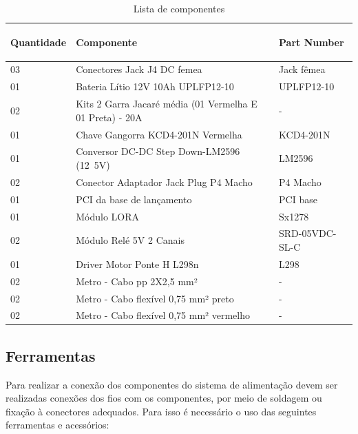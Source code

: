 \begin{table}[H]
\centering
\begin{tabular}{|m{1.8cm} |m{9.2cm}|m{4cm}|}
\hline
\begin{center}Quantidade\end{center} & \begin{center}Componente\end{center} &\begin{center} Part Number\end{center} \\\hline
 03&Conectores Jack J4 DC femea& Jack fêmea \\\hline
 01 & Bateria Lítio 12V 10Ah UPLFP12-10 & UPLFP12-10 \\\hline
 02 & Kits 2 Garra Jacaré média (01 Vermelha E 01 Preta) - 20A & - \\\hline
 01 & Chave Gangorra KCD4-201N Vermelha & KCD4-201N \\\hline
 01 &  Conversor DC-DC Step Down-LM2596 (12~5V)
& LM2596 \\\hline
 02 & Conector Adaptador Jack Plug P4 Macho &  P4 Macho \\\hline
01& PCI da base de lançamento & PCI base \\\hline
01 & Módulo LORA  & Sx1278\\\hline
02 &Módulo Relé 5V 2 Canais   & SRD-05VDC-SL-C  \\\hline
01&Driver Motor Ponte H L298n& L298\\\hline
02 & Metro - Cabo pp 2X2,5 mm² & - \\\hline
02 &Metro - Cabo flexível 0,75 mm² preto & - \\\hline
02& Metro - Cabo flexível 0,75 mm² vermelho & - \\\hline


\end{tabular}
\caption{Lista de componentes}
\end{table}

\subsection*{Ferramentas}

\par Para realizar a conexão dos componentes do sistema de alimentação devem ser realizadas conexões dos fios com os componentes, por meio de soldagem ou fixação à conectores adequados. Para isso é necessário o uso das seguintes ferramentas e acessórios:
	
